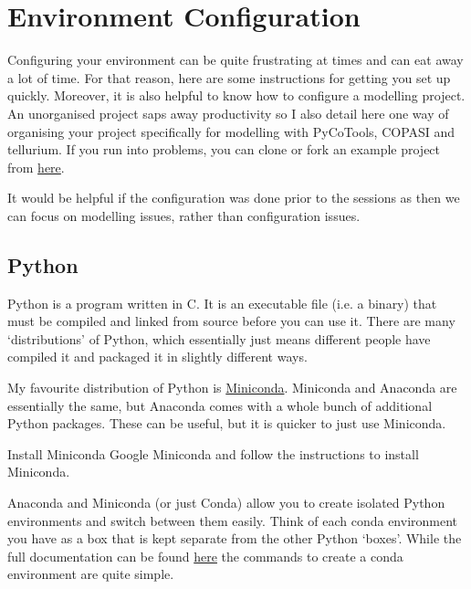 \documentclass[../main]{subfiles}
\begin{document}
\section{Environment Configuration}
Configuring your environment can be quite frustrating at times and can eat away a lot of time. For that reason,
here are some instructions for getting you set up quickly. Moreover, it is also helpful to know how to configure a
modelling project. An unorganised project saps away productivity so I also detail here one way of organising your
project specifically for modelling with PyCoTools, COPASI and tellurium. If you run
into problems, you can clone or fork an example project from \href{https://github.com/CiaranWelsh/ExampleProject}{here}.

It would be helpful if the configuration was done prior to the sessions as then we can focus on modelling
issues, rather than configuration issues.

\subsection{Python}
Python is a program written in C. It is an executable file (i.e. a binary) that must be compiled and linked
from source before you can use it. There are many `distributions' of Python, which essentially just means
different people have compiled it and packaged it in slightly different ways.

My favourite distribution of Python is \href{https://docs.conda.io/en/latest/miniconda.html}{Miniconda}. Miniconda
and Anaconda are essentially the same, but Anaconda comes with a whole bunch of additional Python packages. These
can be useful, but it is quicker to just use Miniconda.

\begin{Task}[label=InstallMiniconda]{Install Miniconda}
Google Miniconda and follow the instructions to install Miniconda.
\end{Task}


Anaconda and Miniconda (or just Conda) allow you to create isolated Python environments
and switch between them easily. Think of each conda environment you have as a box that is
kept separate from the other Python `boxes'. While the full documentation can be found \href{https://docs.conda.io/projects/conda/en/latest/user-guide/tasks/manage-environments.html}{here}
the commands to create a conda environment are quite simple.
\end{document}
